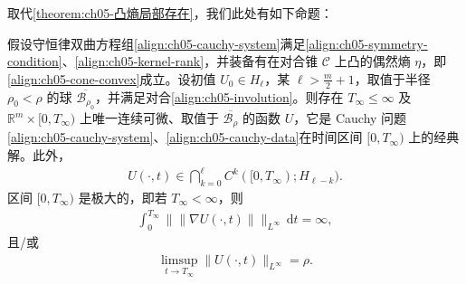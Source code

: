 \documentclass[../../main.tex]{subfiles}
\begin{document}
取代\cref{theorem:ch05-凸熵局部存在}，我们此处有如下命题：

\begin{theorem}\label{theorem:ch05-involution-existence}
假设守恒律双曲方程组\eqref{align:ch05-cauchy-system}满足\eqref{align:ch05-symmetry-condition}、\eqref{align:ch05-kernel-rank}，并装备有在对合锥 $\mathscr{C}$ 上凸的偶然熵 $\eta$，即\eqref{align:ch05-cone-convex}成立。设初值 $U_{0}\in H_{\ell}$，某 $\ell>\frac{m}{2}+1$，取值于半径 $\rho_{0}<\rho$ 的球 $\overline{\mathscr{B}_{\rho_{0}}}$，并满足对合\eqref{align:ch05-involution}。则存在 $T_{\infty}\leqslant\infty$ 及 $\mathbb{R}^{m}\times[0,T_{\infty})$ 上唯一连续可微、取值于 $\overline{\mathscr{B}_{\rho}}$ 的函数 $U$，它是 Cauchy 问题\eqref{align:ch05-cauchy-system}、\eqref{align:ch05-cauchy-data}在时间区间 $[0,T_{\infty})$ 上的经典解。此外，
\begin{align}
U(\cdot,t)\in\bigcap_{k=0}^{\ell}C^{k}([0,T_{\infty});H_{\ell-k}).\label{align:ch05-involution-regularity}
\end{align}
区间 $[0,T_{\infty})$ 是极大的，即若 $T_{\infty}<\infty$，则
\begin{align}
\int_{0}^{T_{\infty}}\|\|\nabla U(\cdot,t)\|\|_{L^{\infty}}\,\mathrm{d}t=\infty,\label{align:ch05-involution-blowup1}
\end{align}
且/或
\begin{align}
\limsup_{t\to T_{\infty}}\|U(\cdot,t)\|_{L^{\infty}}=\rho.\label{align:ch05-involution-blowup2}
\end{align}
\end{theorem}
\end{document}
